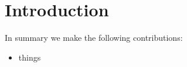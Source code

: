 \section{Introduction}


In summary we make the following contributions:
%
\begin{itemize}
\item   things
\end{itemize}



